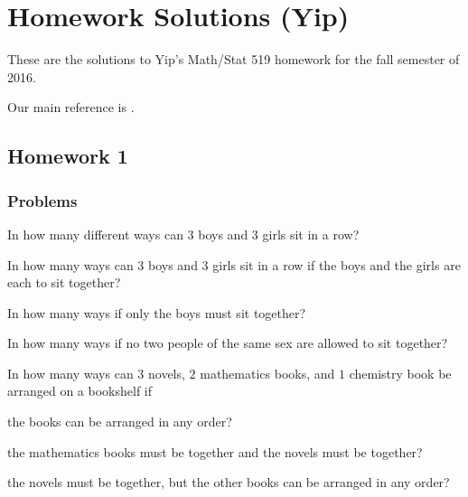 \section{Homework Solutions (Yip)}
These are the solutions to Yip's Math/Stat 519 homework for the fall
semester of 2016.

Our main reference is \cite{ross}.

\subsection{Homework 1}
\subsubsection{Problems}
\begin{problem}[Ross, \S 1, \# 7]
  \hfill
  \begin{alphlist}
  \item In how many different ways can \(3\) boys and \(3\) girls sit in a
    row?
  \item In how many ways can \(3\) boys and \(3\) girls sit in a row if the
    boys and the girls are each to sit together?
  \item In how many ways if only the boys must sit together?
  \item In how many ways if no two people of the same sex are allowed to
    sit together?
  \end{alphlist}
\end{problem}
\begin{solution*}
\end{solution*}

\begin{problem}[Ross, \S 1, \# 11]
  In how many ways can \(3\) novels, \(2\) mathematics books, and \(1\)
  chemistry book be arranged on a bookshelf if
  \begin{alphlist}
  \item the books can be arranged in any order?
  \item the mathematics books must be together and the novels must be
    together?
  \item the novels must be together, but the other books can be arranged in
    any order?
  \end{alphlist}
\end{problem}
\begin{solution*}
\end{solution*}

